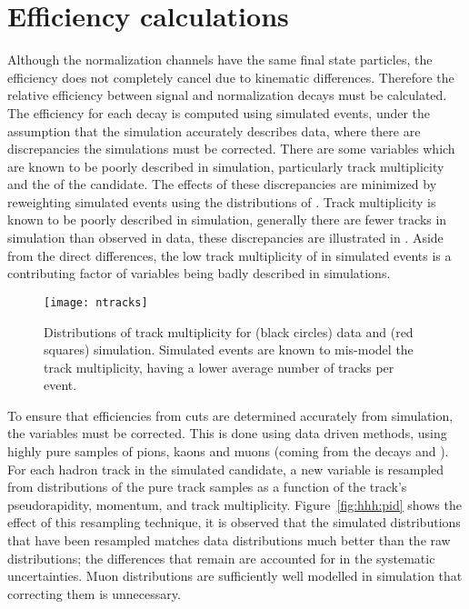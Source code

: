 \section{Efficiency calculations}
\label{sec:hhh:eff}

Although the normalization channels have the same final state particles, the efficiency does not
completely cancel due to kinematic differences.
Therefore the relative efficiency between signal and normalization decays must be calculated.
The efficiency for each decay is computed using simulated events, under the assumption that the
simulation accurately describes data, where there are discrepancies the simulations must be corrected.
There are some variables which are known to be poorly described in simulation, particularly track
multiplicity and the \chisqvtx of the \Bp candidate.
The effects of these discrepancies are minimized by reweighting simulated events using
the distributions of \btojpsikpipi.
Track multiplicity is known to be poorly described in simulation, generally there are fewer tracks
in simulation than observed in data,
these discrepancies are illustrated in .
Aside from the direct differences, the low track multiplicity of in simulated events is a
contributing factor of \pid variables being badly described in simulations.

\begin{figure}[t]
  \begin{center}
    \texttt{[image: ntracks]}
    \caption[Comparison of track multiplicity between data and simulation]
    {
      Distributions of track multiplicity for (black circles) data and (red squares) simulation.
      Simulated events are known to mis-model the track multiplicity, having a lower average number
      of tracks per event.
    }
    \label{fig:hhh:ntracks}
  \end{center}
\end{figure}

To ensure that efficiencies from \pid cuts are determined accurately from simulation, the variables
must be corrected.
This is done using data driven methods, using highly pure samples of pions, kaons
and muons (coming from the decays \decay{\Dstarp}{\Dz(\to\kpi)\pip} and
\jpsitomumu).
For each hadron track in the simulated \Bp candidate, a new \pid variable is resampled from \pid
distributions of the pure track samples as a function of the track's pseudorapidity, momentum, and
track multiplicity.
Figure~\ref{fig:hhh:pid} shows the effect of this resampling technique, it is observed that the
simulated \pid distributions that have been resampled matches data distributions much better than the
raw distributions; the differences that remain are accounted for in the systematic uncertainties.
Muon \pid distributions are sufficiently well modelled in simulation that correcting them is
unnecessary.

